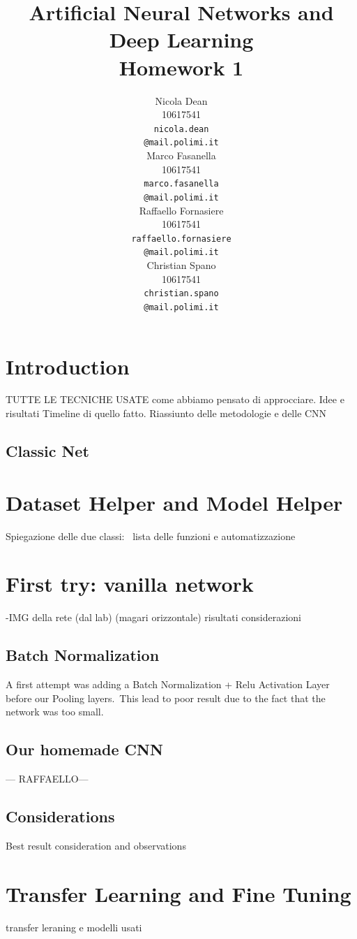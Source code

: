 \documentclass[10pt]{article}
\title{Artificial Neural Networks and Deep Learning \\
Homework 1}
\author{
  Nicola Dean \\
  10617541 \\
  {\tt nicola.dean \\
  \tt @mail.polimi.it} \\\And
  Marco Fasanella \\
  10617541 \\
  {\tt marco.fasanella \\
  \tt @mail.polimi.it} \\\And
  Raffaello Fornasiere \\
    10617541 \\
    {\tt raffaello.fornasiere \\
    \tt @mail.polimi.it} \\\And
  Christian Spano \\
  10617541 \\
  {\tt christian.spano \\
  \tt @mail.polimi.it} \\}
\date{}
\begin{document}
\maketitle



\section{Introduction}


TUTTE LE TECNICHE USATE
come abbiamo pensato di approcciare.
Idee e risultati
Timeline di quello fatto.
Riassiunto delle metodologie e delle CNN
\subsection{Classic Net}


\section{Dataset Helper and Model Helper}
Spiegazione delle due classi: \
lista delle funzioni e automatizzazione

\section{First try: vanilla network}

-IMG della rete (dal lab) (magari orizzontale)
risultati
considerazioni
\subsection{Batch Normalization}
A first attempt was adding a Batch Normalization + Relu Activation Layer before our Pooling layers.\
This lead to poor result due to the fact that the network was too small.
\subsection{Our homemade CNN}
--- RAFFAELLO---
\subsection{Considerations}
Best result consideration and observations
\section{Transfer Learning and Fine Tuning}
transfer leraning e modelli usati
\end{document}
